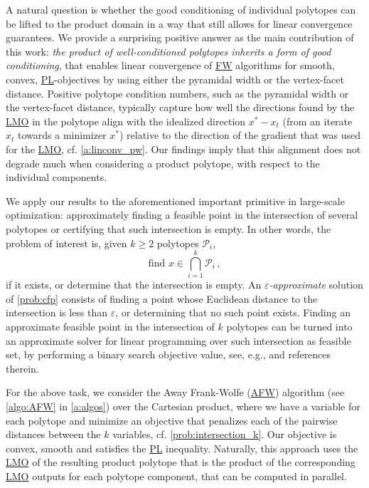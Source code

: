 \documentclass{article}
\makeatletter
\newcommand{\R}{\mathbb{R}}
\newcommand{\mP}{\mathcal{P}}
\let\epsilon\varepsilon
\newcommand\newlink[2]{\hyperlink{#1}{\normalcolor #2}}
\newcommand\newtarget[2]{\Hy@raisedlink{\hypertarget{#1}{}}#2}
\newcommand{\PL}{\newlink{def:acronym_polyak_lojasiewicz}{PL}}
\newcommand{\FW}{\newlink{def:acronym_frank_wolfe}{FW}}
\newcommand{\AFW}{\newlink{def:acronym_away_frank_wolfe}{AFW}}
\newcommand{\LMO}{\newlink{def:acronym_linear_minimization_oracle}{LMO}}
\makeatother
\begin{document}
A natural question is whether the good conditioning of individual polytopes can be lifted to the product domain in a way that still allows for linear convergence guarantees. We provide a surprising positive answer as the main contribution of this work: \emph{the product of well-conditioned polytopes inherits a form of good conditioning}, that enables linear convergence of \FW{} algorithms for smooth, convex, \PL{}-objectives by using either the pyramidal width or the vertex-facet distance. Positive polytope condition numbers, such as the pyramidal width or the vertex-facet distance, typically capture how well the directions found by the \LMO{} in the polytope align with the idealized direction $x^\ast - x_t$ (from an iterate $x_t$ towards a minimizer $x^\ast$) relative to the direction of the gradient that was used for the \LMO{}, cf. \cref{a:linconv_pw}. Our findings imply that this alignment does not degrade much when considering a product polytope, with respect to the individual components.

We apply our results to the aforementioned important primitive in large-scale optimization: approximately finding a feasible point in the intersection of several polytopes or certifying that such intersection is empty. In other words, the problem of interest is, given $k \geq 2$ polytopes $\mP_i$,
\begin{equation}
\text{find } x \in \bigcap_{i=1}^k \mathcal{P}_i\,, \tag{P}
\label{prob:cfp}
\end{equation}
if it exists, or determine that the intersection is empty. An  \emph{$\epsilon$-approximate} solution of \eqref{prob:cfp} consists of finding a point whose Euclidean distance to the intersection is less than $\epsilon$, or determining that no such point exists. Finding an approximate feasible point in the intersection of $k$ polytopes can be turned into an approximate solver for linear programming over such intersection as feasible set, by performing a binary search objective value, see, e.g., \cite{DVZ22} and references therein.

For the above task, we consider the Away Frank-Wolfe (\newtarget{def:acronym_away_frank_wolfe}{\AFW{}}) algorithm \cite{GM86} (see \cref{algo:AFW} in \cref{a:algos}) over the Cartesian product, where we have a variable for each polytope and minimize an objective that penalizes each of the pairwise distances between the $k$ variables, cf. \eqref{prob:intersection_k}. Our objective is convex, smooth and satisfies the \PL{} inequality. Naturally, this approach uses the \LMO{} of the resulting product polytope that is the product of the corresponding  \LMO{} outputs for each polytope component, that can be computed in parallel.
\end{document}
